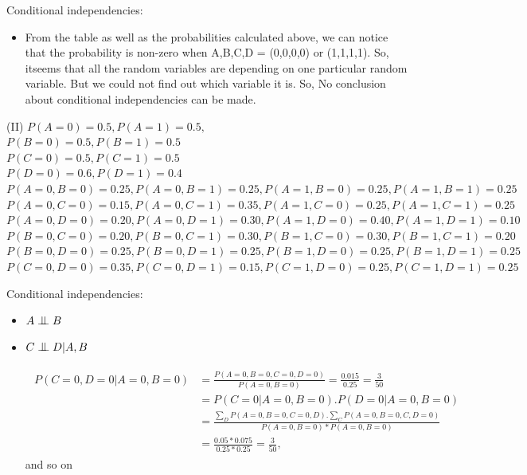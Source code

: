 \documentclass[fleqn]{article}
\newcommand{\bigCI}{\mathrel{\text{\scalebox{1.07}{$\perp\mkern-10mu\perp$}}}}
\begin{document}
Conditional independencies:

\begin{itemize}
  \item From the table as well as the probabilities calculated above, we can notice that the probability is non-zero when A,B,C,D = (0,0,0,0) or
  (1,1,1,1). So, itseems that all the random variables are depending on one particular random variable. But we could not find out which variable
  it is. So, No conclusion about conditional independencies can be made.
\end{itemize}


\noindent(II)
{
\small
 $P(A=0) = 0.5, P(A=1) = 0.5, $\\
\hspace*{1em} $P(B=0) = 0.5, P(B=1) = 0.5$\\
\hspace*{1em} $P(C=0) = 0.5, P(C=1) = 0.5$\\
\hspace*{1em} $P(D=0) = 0.6, P(D=1) = 0.4$\\
\hspace*{1em} $P(A=0, B=0) = 0.25, P(A=0, B=1) = 0.25, P(A=1, B=0) = 0.25, P(A=1, B=1) = 0.25$\\
\hspace*{1em} $P(A=0, C=0) = 0.15, P(A=0, C=1) = 0.35, P(A=1, C=0) = 0.25, P(A=1, C=1) = 0.25$\\
\hspace*{1em} $P(A=0, D=0) = 0.20, P(A=0, D=1) = 0.30, P(A=1, D=0) = 0.40, P(A=1, D=1) = 0.10$\\
\hspace*{1em} $P(B=0, C=0) = 0.20, P(B=0, C=1) = 0.30, P(B=1, C=0) = 0.30, P(B=1, C=1) = 0.20$\\
\hspace*{1em} $P(B=0, D=0) = 0.25, P(B=0, D=1) = 0.25, P(B=1, D=0) = 0.25, P(B=1, D=1) = 0.25$\\
\hspace*{1em} $P(C=0, D=0) = 0.35, P(C=0, D=1) = 0.15, P(C=1, D=0) = 0.25, P(C=1, D=1) = 0.25$\\
}

Conditional independencies:

\begin{itemize}
  \item $A \bigCI B$
  \item $C \bigCI D | A, B$ 
  
  \begin{eqnarray*}
  \begin{aligned}
  P(C=0, D=0 | A=0,B=0)&=\frac{P(A=0,B=0,C=0,D=0)}{P(A=0,B=0)}=\frac{0.015}{0.25}=\frac{3}{50}\\ 
  &= P(C=0|A=0,B=0).P(D=0|A=0,B=0)\\
  &=\frac{\sum_D P(A=0,B=0,C=0,D). \sum_C P(A=0,B=0,C,D=0)}{P(A=0,B=0)*P(A=0,B=0)}\\
  &=\frac{0.05*0.075}{0.25 * 0.25}=\frac{3}{50},
  \end{aligned}
  \end{eqnarray*}
   and so on
\end{itemize}
\end{document}
